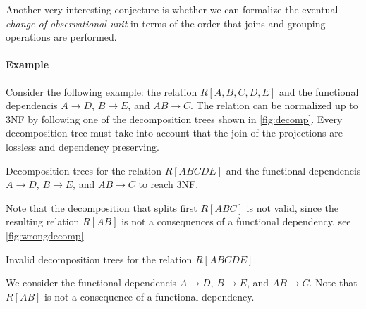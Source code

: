 Another very interesting conjecture is whether we can formalize the eventual \emph{change
of observational unit} in terms of the order that joins and grouping operations are
performed.

\paragraph{Example}
Consider the following example: the relation $R[A, B, C, D, E]$ and the functional
dependencis $A \to D$, $B \to E$, and $AB \to C$.  The relation can be normalized up to
3NF by following one of the decomposition trees shown in \cref{fig:decomp}.
Every decomposition tree must take into account that the join of the projections are
lossless and dependency preserving.

\begin{figurebox}[label=fig:decomp]{Decomposition trees for the relation $R[ABCDE]$ and the functional dependencis $A \to D$, $B \to E$, and $AB \to C$ to reach 3NF.}
  \centering
\end{figurebox}

Note that the decomposition that splits first $R[ABC]$ is not valid, since the resulting
relation $R[AB]$ is not a consequences of a functional dependency, see
\cref{fig:wrongdecomp}.

\begin{figurebox}[label=fig:wrongdecomp]{Invalid decomposition trees for the relation $R[ABCDE]$.}
  \centering
  \tcblower
  We consider the functional dependencis $A \to D$, $B \to E$, and $AB \to C$.
  Note that $R[AB]$ is not a consequence of a functional dependency.
\end{figurebox}

